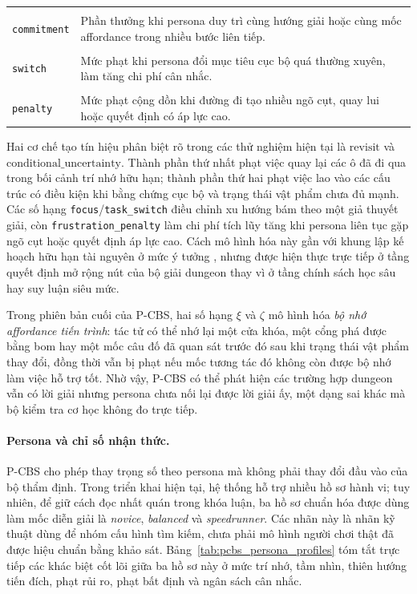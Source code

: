 \documentclass[oneside,a4paper,12pt]{extreport}
\begin{document}
\begin{table}[H]
\begin{tabular}{>{\raggedright\arraybackslash}p{3.05cm} >{\raggedright\arraybackslash}p{8.75cm}}
\shortstack[l]{\texttt{focus\_}\\\texttt{commitment}} & Phần thưởng khi persona duy trì cùng hướng giải hoặc cùng mốc affordance trong nhiều bước liên tiếp. \\
\shortstack[l]{\texttt{task\_}\\\texttt{switch}} & Mức phạt khi persona đổi mục tiêu cục bộ quá thường xuyên, làm tăng chi phí cân nhắc. \\
\shortstack[l]{\texttt{frustration\_}\\\texttt{penalty}} & Mức phạt cộng dồn khi đường đi tạo nhiều ngõ cụt, quay lui hoặc quyết định có áp lực cao. \\
\bottomrule
\end{tabular}
\end{table}
Hai cơ chế tạo tín hiệu phân biệt rõ trong các thử nghiệm hiện tại là $\mathrm{revisit}$ và $\mathrm{conditional\_uncertainty}$. Thành phần thứ nhất phạt việc quay lại các ô đã đi qua trong bối cảnh trí nhớ hữu hạn; thành phần thứ hai phạt việc lao vào các cấu trúc có điều kiện khi bằng chứng cục bộ và trạng thái vật phẩm chưa đủ mạnh. Các số hạng \texttt{focus}/\texttt{task\_switch} điều chỉnh xu hướng bám theo một giả thuyết giải, còn \texttt{frustration\_penalty} làm chi phí tích lũy tăng khi persona liên tục gặp ngõ cụt hoặc quyết định áp lực cao. Cách mô hình hóa này gần với khung lập kế hoạch hữu hạn tài nguyên ở mức ý tưởng \cite{callaway2022cognitiveresources,lancia2023inforl}, nhưng được hiện thực trực tiếp ở tầng quyết định mở rộng nút của bộ giải dungeon thay vì ở tầng chính sách học sâu hay suy luận siêu mức.

Trong phiên bản cuối của P-CBS, hai số hạng $\xi$ và $\zeta$ mô hình hóa \emph{bộ nhớ affordance tiến trình}: tác tử có thể nhớ lại một cửa khóa, một cổng phá được bằng bom hay một mốc câu đố đã quan sát trước đó sau khi trạng thái vật phẩm thay đổi, đồng thời vẫn bị phạt nếu mốc tương tác đó không còn được bộ nhớ làm việc hỗ trợ tốt. Nhờ vậy, P-CBS có thể phát hiện các trường hợp dungeon vẫn có lời giải nhưng persona chưa nối lại được lời giải ấy, một dạng sai khác mà bộ kiểm tra cơ học không đo trực tiếp.

\paragraph{Persona và chỉ số nhận thức.}
P-CBS cho phép thay trọng số theo persona mà không phải thay đổi đầu vào của bộ thẩm định. Trong triển khai hiện tại, hệ thống hỗ trợ nhiều hồ sơ hành vi; tuy nhiên, để giữ cách đọc nhất quán trong khóa luận, ba hồ sơ chuẩn hóa được dùng làm mốc diễn giải là \emph{novice}, \emph{balanced} và \emph{speedrunner}. Các nhãn này là nhãn kỹ thuật dùng để nhóm cấu hình tìm kiếm, chưa phải mô hình người chơi thật đã được hiệu chuẩn bằng khảo sát. Bảng~\ref{tab:pcbs_persona_profiles} tóm tắt trực tiếp các khác biệt cốt lõi giữa ba hồ sơ này ở mức trí nhớ, tầm nhìn, thiên hướng tiến đích, phạt rủi ro, phạt bất định và ngân sách cân nhắc.
\end{document}
